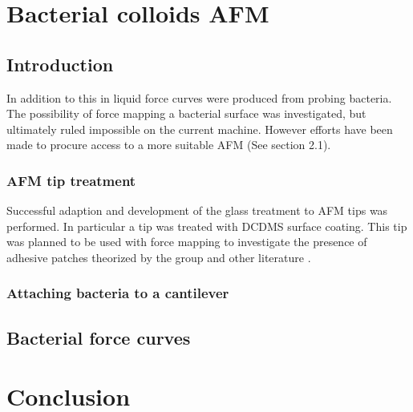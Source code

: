 \chapter{Bacterial colloids AFM}

\section{Introduction}

In addition to this in liquid force curves were produced from probing bacteria. The possibility of force mapping a bacterial surface was investigated, but ultimately ruled impossible on the current machine. However efforts have been made to procure access to a more suitable AFM (See section 2.1).

\subsection{AFM tip treatment} 

Successful adaption and development of the glass treatment to AFM tips was performed. In particular a tip was treated with DCDMS surface coating. This tip was planned to be used with force mapping to investigate the presence of adhesive patches theorized by the group \cite{Teun1} and other literature \cite{Patchy}. 

\subsection{Attaching bacteria to a cantilever}
\newpage

\section{Bacterial force curves}

\newpage
\newpage
\newpage

\chapter{Conclusion}